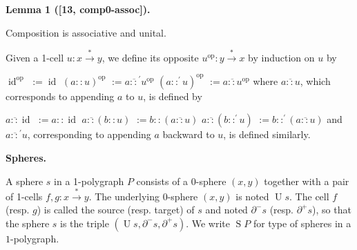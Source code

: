 \documentclass[10pt,a4paper]{amsart}
\begin{document}
\par\medskip\noindent\textbf{Lemma 1 ([13, comp0-assoc]).}\par
 
 
Composition is associative and unital.\par
 
 
 
 
Given a 1-cell $u:x\overset{*}{\to}y$, we define its opposite $u^{\mathrm{op}}:y\overset{*}{\to}x$ by induction on $u$ by\par
    $\displaystyle\operatorname{id}^{\mathrm{op}}$ $\displaystyle:=\operatorname{id}$ $\displaystyle(a::u)^{\mathrm{op}}$ $\displaystyle:=a\mathbin{\overline{::}^{\prime}}u^{\mathrm{op}}$ $\displaystyle(a::^{\prime}u)^{\mathrm{op}}$ $\displaystyle:=a\mathbin{\overline{::}}u^{\mathrm{op}}$    
where $a\mathbin{\overline{::}}u$, which corresponds to appending $a$ to $u$, is defined by\par
    $\displaystyle a\mathbin{\overline{::}}\operatorname{id}$ $\displaystyle:=a::\operatorname{id}$ $\displaystyle a\mathbin{\overline{::}}(b::u)$ $\displaystyle:=b::(a\mathbin{\overline{::}}u)$ $\displaystyle a\mathbin{\overline{::}}(b::^{\prime}u)$ $\displaystyle:=b::^{\prime}(a\mathbin{\overline{::}}u)$    
and $a\mathbin{\overline{::}^{\prime}}u$, corresponding to appending $a$ backward to $u$, is defined similarly.\par
 
 
 
 
\par\medskip\noindent\textbf{Spheres.}\par
 
 
A sphere $s$ in a 1-polygraph $P$ consists of a $0$-sphere $(x,y)$ together with a pair of 1-cells $f,g:x\overset{*}{\to}y$. The underlying 0-sphere $(x,y)$ is noted $\operatorname{U}s$. The cell $f$ (resp. $g$) is called the source (resp. target) of $s$ and noted $\partial^{-}s$ (resp. $\partial^{+}s$), so that the sphere $s$ is the triple $(\operatorname{U}s,\partial^{-}s,\partial^{+}s)$. We write $\operatorname{S}P$ for type of spheres in a $1$-polygraph.\par
 
\end{document}
